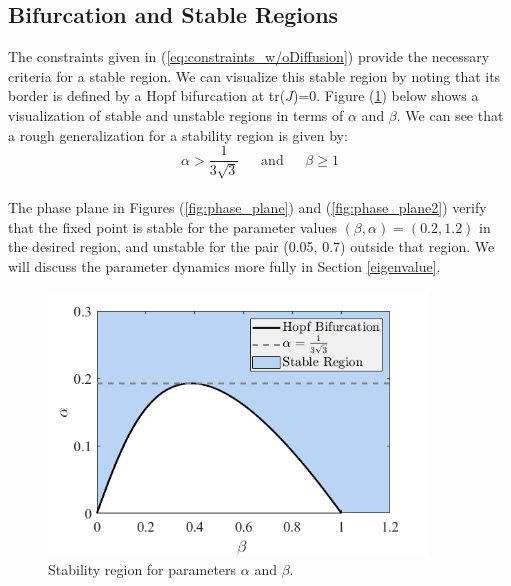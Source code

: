 \documentclass[12pt]{article}
\begin{document}
\subsection{Bifurcation and Stable Regions}\label{bifurcation}

The constraints given in (\ref{eq:constraints_w/oDiffusion}) provide the necessary criteria for a stable region. We can visualize this stable region by noting that its border is defined by a Hopf bifurcation at tr($J$)=0. Figure (\ref{fig:stability_region}) below shows a visualization of stable and unstable regions in terms of $\alpha$ and $\beta$. We can see that a rough generalization for a stability region is given by:
\\
$$ \alpha > \frac{1}{3\sqrt{3}} ~~~~~~~ \text{and} ~~~~~~~ \beta \geq 1 $$
\\
The phase plane in Figures (\ref{fig:phase_plane}) and (\ref{fig:phase_plane2}) verify that the fixed point is stable for the parameter values $(\beta,\alpha)=(0.2,1.2)$ in the desired region, and unstable for the pair (0.05, 0.7) outside that region. We will discuss the parameter dynamics more fully in Section \ref{eigenvalue}.

\begin{figure}[H]
    \centering
    \includegraphics[width = 10cm,trim=5pts 1pts 5pts 17pts, clip]{images/stability_region.png}
    \caption{Stability region for parameters $\alpha$ and $\beta$.}
    \label{fig:stability_region}
\end{figure}

\vfill
\end{document}
